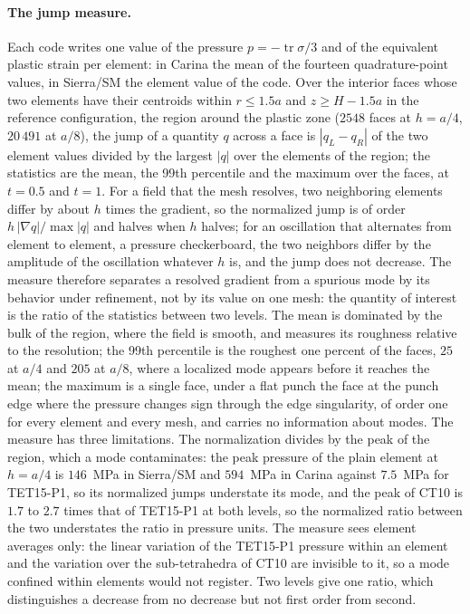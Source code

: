 \documentclass{article}
\theoremstyle{definition}
\theoremstyle{plain}
\begin{document}
\paragraph{The jump measure.} Each code writes one value of the pressure
$p = -\operatorname{tr}\sigma/3$ and of the equivalent plastic strain per
element: in Carina the mean of the fourteen quadrature-point values, in
Sierra/SM the element value of the code. Over the interior faces whose two
elements have their centroids within $r \le 1.5a$ and $z \ge H - 1.5a$ in
the reference configuration, the region around the plastic zone ($2548$
faces at $h = a/4$, $20\,491$ at $a/8$), the jump of a quantity $q$ across
a face is $|q_L - q_R|$ of the two element values divided by the largest
$|q|$ over the elements of the region; the statistics are the mean, the
99th percentile and the maximum over the faces, at $t = 0.5$ and $t = 1$.
For a field that the mesh resolves, two neighboring elements differ by
about $h$ times the gradient, so the normalized jump is of order
$h\,|\nabla q|/\max|q|$ and halves when $h$ halves; for an oscillation
that alternates from element to element, a pressure checkerboard, the two
neighbors differ by the amplitude of the oscillation whatever $h$ is, and
the jump does not decrease. The measure therefore separates a resolved
gradient from a spurious mode by its behavior under refinement, not by its
value on one mesh: the quantity of interest is the ratio of the statistics
between two levels. The mean is dominated by the bulk of the region, where
the field is smooth, and measures its roughness relative to the resolution;
the 99th percentile is the roughest one percent of the faces, $25$ at $a/4$
and $205$ at $a/8$, where a localized mode appears before it reaches the
mean; the maximum is a single face, under a flat punch the face at the
punch edge where the pressure changes sign through the edge singularity, of
order one for every element and every mesh, and carries no information
about modes. The measure has three limitations. The normalization divides
by the peak of the region, which a mode contaminates: the peak pressure of
the plain element at $h = a/4$ is $146$~MPa in Sierra/SM and $594$~MPa in
Carina against $7.5$~MPa for TET15-P1, so its normalized jumps understate
its mode, and the peak of CT10 is $1.7$ to $2.7$ times that of TET15-P1 at
both levels, so the normalized ratio between the two understates the ratio
in pressure units. The measure sees element averages only: the linear
variation of the TET15-P1 pressure within an element and the variation over
the sub-tetrahedra of CT10 are invisible to it, so a mode confined within
elements would not register. Two levels give one ratio, which distinguishes
a decrease from no decrease but not first order from second.
\end{document}
